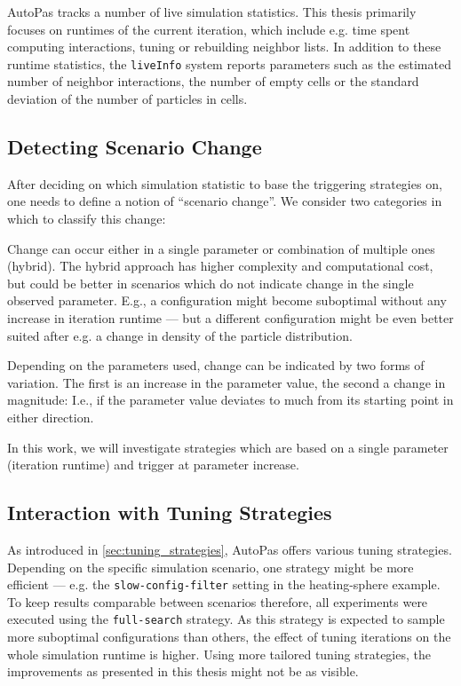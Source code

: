 AutoPas tracks a number of live simulation statistics. This thesis primarily focuses on runtimes of the current iteration, which include e.g. time spent computing interactions, tuning or rebuilding neighbor lists.
In addition to these runtime statistics, the \texttt{liveInfo} system reports parameters such as the estimated number of neighbor interactions, the number of empty cells or the standard deviation of the number of particles in cells. \cite{Newcome2025}

\subsection{Detecting Scenario Change}
After deciding on which simulation statistic to base the triggering strategies on, one needs to define a notion of \enquote{scenario change}. We consider two categories in which to classify this change:

\begin{description}[leftmargin=!,labelwidth=\widthof{\textbf{Type of variation }}]
	\item[\textbf{Parameter Space}] Change can occur either in a single parameter or combination of multiple ones (hybrid). The hybrid approach has higher complexity and computational cost, but could be better in scenarios which do not indicate change in the single observed parameter. E.g., a configuration might become suboptimal without any increase in iteration runtime --- but a different configuration might be even better suited after e.g. a change in density of the particle distribution.
	\item[\textbf{Type of Variation}] Depending on the parameters used, change can be indicated by two forms of variation. The first is an increase in the parameter value, the second a change in magnitude: I.e., if the parameter value deviates to much from its starting point in either direction.
\end{description}

In this work, we will investigate strategies which are based on a single parameter (iteration runtime) and trigger at parameter increase.


\subsection{Interaction with Tuning Strategies}
As introduced in \autoref{sec:tuning_strategies}, AutoPas offers various tuning strategies. Depending on the specific simulation scenario, one strategy might be more efficient --- e.g. the \texttt{slow-config-filter} setting in the heating-sphere example. To keep results comparable between scenarios therefore, all experiments were executed using the \texttt{full-search} strategy. As this strategy is expected to sample more suboptimal configurations than others, the effect of tuning iterations on the whole simulation runtime is higher. Using more tailored tuning strategies, the improvements as presented in this thesis might not be as visible.


